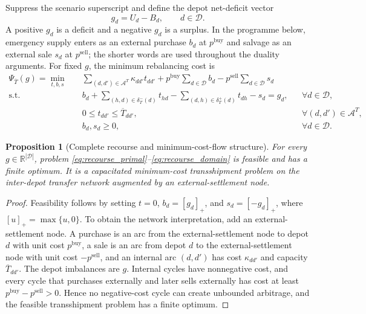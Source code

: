 \documentclass[authoryear,final,3p,times]{elsarticle}
\newtheorem{proposition}{Proposition}
\theoremstyle{definition}
\theoremstyle{plain}
\begin{document}
Suppress the scenario superscript and define the depot net-deficit vector
\begin{equation}
g_d=U_d-B_d,
\qquad d\in\mathcal D.
\label{eq:net_deficit}
\end{equation}
A positive $g_d$ is a deficit and a negative $g_d$ is a surplus.  In the
programme below, emergency supply enters as an external purchase $b_d$ at
$p^{\mathrm{buy}}$ and salvage as an external sale $s_d$ at $p^{\mathrm{sell}}$;
the shorter words are used throughout the duality arguments.  For fixed
$g$, the minimum rebalancing cost is
\begin{align}
\Psi_{\overline T}(g)=
\min_{t,b,s}\quad&
\sum_{(d,d')\in\mathcal A^T}\kappa_{dd'}t_{dd'}
+p^{\mathrm{buy}}\sum_{d\in\mathcal D}b_d
-p^{\mathrm{sell}}\sum_{d\in\mathcal D}s_d
\label{eq:recourse_primal}\\
\text{s.t.}\quad&
 b_d+\sum_{(h,d)\in\delta_T^-(d)}t_{hd}
 -\sum_{(d,h)\in\delta_T^+(d)}t_{dh}-s_d=g_d,
&&\forall d\in\mathcal D,
\label{eq:recourse_balance}\\
&0\le t_{dd'}\le\overline T_{dd'},
&&\forall(d,d')\in\mathcal A^T,
\label{eq:recourse_capacity}\\
&b_d,s_d\ge0,
&&\forall d\in\mathcal D.
\label{eq:recourse_domain}
\end{align}

\begin{proposition}[Complete recourse and minimum-cost-flow structure]
\label{prop:recourse_flow}
For every $g\in\mathbb R^{|\mathcal D|}$, problem
\eqref{eq:recourse_primal}--\eqref{eq:recourse_domain} is feasible and has a
finite optimum.  It is a capacitated minimum-cost transshipment problem on the
inter-depot transfer network augmented by an external-settlement node.
\end{proposition}

\begin{proof}
Feasibility follows by setting $t=0$, $b_d=[g_d]_+$, and
$s_d=[-g_d]_+$, where $[u]_+=\max\{u,0\}$.  To obtain the network
interpretation, add an external-settlement node.  A purchase is an arc from the
external-settlement node to depot $d$ with unit cost $p^{\mathrm{buy}}$, a sale is an arc
from depot $d$ to the external-settlement node with unit cost $-p^{\mathrm{sell}}$, and an
internal arc $(d,d')$ has cost $\kappa_{dd'}$ and capacity
$\overline T_{dd'}$.  The depot imbalances are $g$.  Internal cycles have
nonnegative cost, and every cycle that purchases externally and later sells
externally has cost at least
$p^{\mathrm{buy}}-p^{\mathrm{sell}}>0$.  Hence no negative-cost cycle can
create unbounded arbitrage, and the feasible transshipment problem has a
finite optimum.
\end{proof}
\end{document}
